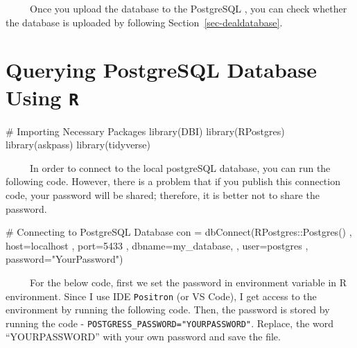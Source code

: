 \documentclass[
  letterpaper,
  DIV=11,
  numbers=noendperiod]{scrreprt}
\newenvironment{Shaded}{\begin{snugshade}}{\end{snugshade}}
\newcommand{\AttributeTok}[1]{\textcolor[rgb]{0.40,0.45,0.13}{#1}}
\newcommand{\CommentTok}[1]{\textcolor[rgb]{0.37,0.37,0.37}{#1}}
\newcommand{\FunctionTok}[1]{\textcolor[rgb]{0.28,0.35,0.67}{#1}}
\newcommand{\NormalTok}[1]{\textcolor[rgb]{0.00,0.23,0.31}{#1}}
\newcommand{\OtherTok}[1]{\textcolor[rgb]{0.00,0.23,0.31}{#1}}
\newcommand{\SpecialCharTok}[1]{\textcolor[rgb]{0.37,0.37,0.37}{#1}}
\newcommand{\StringTok}[1]{\textcolor[rgb]{0.13,0.47,0.30}{#1}}
\begin{document}
~~~~~Once you upload the database to the PostgreSQL , you can check
whether the database is uploaded by following
Section~\ref{sec-dealdatabase}.

\section{\texorpdfstring{Querying PostgreSQL Database Using
\texttt{R}}{Querying PostgreSQL Database Using R}}\label{querying-postgresql-database-using-r}

\begin{Shaded}
\begin{Highlighting}[]
\CommentTok{\# Importing Necessary Packages}
\FunctionTok{library}\NormalTok{(DBI)}
\FunctionTok{library}\NormalTok{(RPostgres)}
\FunctionTok{library}\NormalTok{(askpass)}
\FunctionTok{library}\NormalTok{(tidyverse)}
\end{Highlighting}
\end{Shaded}

~~~~~In order to connect to the local postgreSQL database, you can run
the following code. However, there is a problem that if you publish this
connection code, your password will be shared; therefore, it is better
not to share the password.

\begin{Shaded}
\begin{Highlighting}[]
\CommentTok{\# Connecting to PostgreSQL Database }
\NormalTok{con }\OtherTok{=} \FunctionTok{dbConnect}\NormalTok{(RPostgres}\SpecialCharTok{::}\FunctionTok{Postgres}\NormalTok{()}
\NormalTok{                 , }\AttributeTok{host=}\StringTok{\textquotesingle{}localhost\textquotesingle{}}
\NormalTok{                 , }\AttributeTok{port=}\StringTok{\textquotesingle{}5433\textquotesingle{}}
\NormalTok{                 , }\AttributeTok{dbname=}\StringTok{\textquotesingle{}my\_database\textquotesingle{}}\NormalTok{,}
\NormalTok{                 , }\AttributeTok{user=}\StringTok{\textquotesingle{}postgres\textquotesingle{}}
\NormalTok{                 , }\AttributeTok{password=}\StringTok{"YourPassword"}\NormalTok{) }
\end{Highlighting}
\end{Shaded}

~~~~~For the below code, first we set the password in environment
variable in R environment. Since I use IDE \texttt{Positron} (or VS
Code), I get access to the environment by running the following code.
Then, the password is stored by running the code -
\texttt{POSTGRESS\_PASSWORD="YOURPASSWORD"}. Replace, the word
``YOURPASSWORD'' with your own password and save the file.
\end{document}
